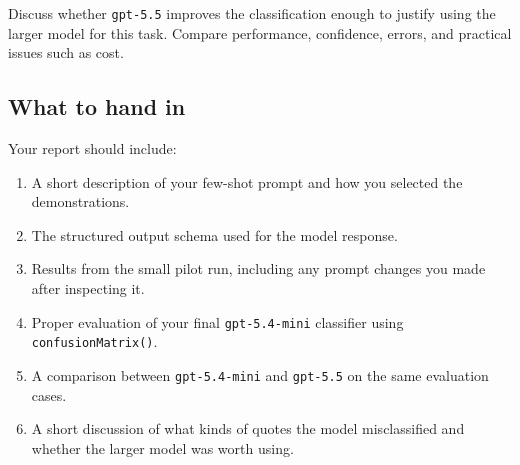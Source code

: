 \documentclass[11pt,a4paper,english]{article}\usepackage[]{graphicx}\usepackage[]{xcolor}
\begin{document}
Discuss whether \texttt{gpt-5.5} improves the classification enough to justify using the larger model for this task. Compare performance, confidence, errors, and practical issues such as cost.

\subsection{What to hand in}

Your report should include:

\begin{enumerate}
\item A short description of your few-shot prompt and how you selected the demonstrations.
\item The structured output schema used for the model response.
\item Results from the small pilot run, including any prompt changes you made after inspecting it.
\item Proper evaluation of your final \texttt{gpt-5.4-mini} classifier using \texttt{confusionMatrix()}.
\item A comparison between \texttt{gpt-5.4-mini} and \texttt{gpt-5.5} on the same evaluation cases.
\item A short discussion of what kinds of quotes the model misclassified and whether the larger model was worth using.
\end{enumerate}

\newpage
\end{document}
